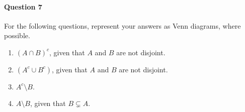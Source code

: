 \paragraph{Question 7}
For the following questions, represent your answers as Venn diagrams, where possible.
\begin{enumerate}
    
    \item $(A \cap B)^c$, given that $A$ and $B$ are not disjoint.
    \vspace{8em}
    
    \item $(A^c \cup B^c)$, given that $A$ and $B$ are not disjoint.
    \vspace{8em}
    
    \item $A^c \setminus B$.
    \vspace{8em}
    
    \item $A \setminus B$, given that $B \subsetneq A$. 
    \vspace{8em}
    
    \vspace{5em}
    
    
\end{enumerate}


